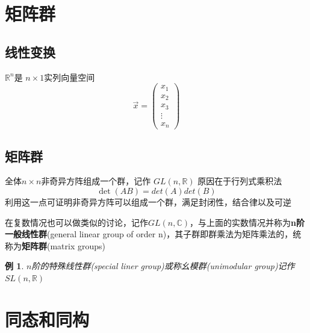\documentclass[hyperref,UTF8]{ctexbook}
\newtheorem{eg}{例}[chapter]
\begin{document}
\section{矩阵群}
\subsection{线性变换}
$\mathbb{R}^{n}$是 $n\times 1$实列向量空间
\[\vec{x}=\begin{pmatrix}
    x_1\\x_2\\x_3\\\vdots\\x_n
\end{pmatrix}\]  
\subsection{矩阵群}
全体$n\times n$非奇异方阵组成一个群，记作 $GL(n,\mathbb{R})$ 原因在于行列式乘积法
\[\det(AB)=det(A)det(B)\] 
利用这一点可证明非奇异方阵可以组成一个群，满足封闭性，结合律以及可逆

在复数情况也可以做类似的讨论，记作$GL(n,\mathbb{C})$，与上面的实数情况并称为\textbf{n阶一般线性群}(general linear group of order n)，其子群即群乘法为矩阵乘法的，统称为\textbf{矩阵群}(matrix groups)
\begin{eg}
    $n$阶的特殊线性群(special liner group)或称幺模群(unimodular group)记作$SL(n,\mathbb{R})$
\end{eg}
\section{同态和同构}
\end{document}
